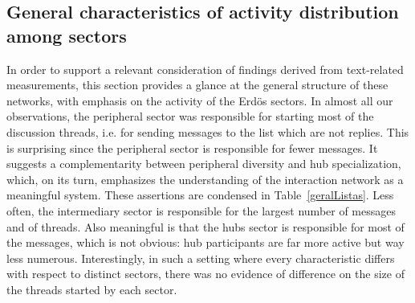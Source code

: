 \documentclass[review]{elsarticle}
\begin{document}
\subsection{General characteristics of activity distribution among sectors}\label{sec:gen}
In order to support a relevant consideration of findings derived from text-related measurements,
this section provides a glance at the general structure of these networks,
with emphasis on the activity of the Erdös sectors.
In almost all our observations,
the peripheral sector was responsible for starting most of the discussion threads,
i.e. for sending messages to the list which are not replies.
This is surprising since the peripheral sector is responsible for fewer messages.
It suggests a complementarity between peripheral diversity and hub specialization, which, on its turn, emphasizes the understanding of the interaction network as a meaningful system. 
These assertions are condensed in Table~\ref{geralListas}.
Less often, the intermediary sector is responsible for the largest number of messages and of threads.
Also meaningful is that the hubs sector is responsible for most of the messages, which is not obvious: hub participants are far more active but way less numerous. Interestingly, in such a setting where every characteristic differs with respect to
distinct sectors, there was no evidence of difference on the size of the threads started by each sector.

\end{document}
